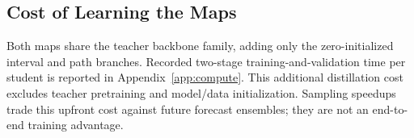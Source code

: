 \subsection{Cost of Learning the Maps}
Both maps share the teacher backbone family, adding only the zero-initialized interval and path branches. Recorded two-stage training-and-validation time per student is reported in Appendix~\ref{app:compute}. This additional distillation cost excludes teacher pretraining and model/data initialization. Sampling speedups trade this upfront cost against future forecast ensembles; they are not an end-to-end training advantage. 
